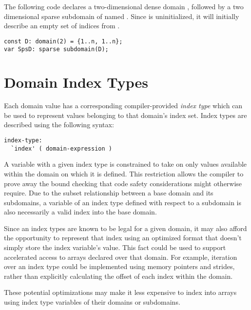 \begin{example}
The following code declares a two-dimensional dense domain ,
followed by a two dimensional sparse subdomain of 
named .  Since  is uninitialized, it will
initially describe an empty set of indices from .
\begin{chapel}
\begin{verbatim}
const D: domain(2) = {1..n, 1..n};
var SpsD: sparse subdomain(D);
\end{verbatim}
\end{chapel}
\end{example}

\section{Domain Index Types}
\label{Index_Types}

Each domain value has a corresponding compiler-provided \emph{index
type} which can be used to represent values belonging to that domain's
index set.  Index types are described using the following syntax:

\begin{syntax}
\begin{verbatim}
index-type:
  `index' ( domain-expression )
\end{verbatim}
\end{syntax}

A variable with a given index type is constrained to take on only values
available within the domain on which it is defined.  This restriction allows the
compiler to prove away the bound checking that code safety considerations might
otherwise require.  Due to the subset relationship between a base domain and its
subdomains, a variable of an index type defined with respect to a subdomain is
also necessarily a valid index into the base domain.

Since an index types are known to be legal for a given domain, it may
also afford the opportunity to represent that index using an optimized
format that doesn't simply store the index variable's value.  This fact could be
used to support accelerated access to arrays declared over that domain.  For
example, iteration over an index type could be implemented using memory pointers
and strides, rather than explicitly calculating the offset of each index
within the domain.

These potential optimizations may make it less expensive to
index into arrays using index type variables of their domains or
subdomains.

